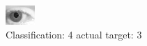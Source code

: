 \begin{figure}[h!]
\begin{center}
\includegraphics[width=0.60\columnwidth]{figures/ID191_class_4_target_3.png}
\end{center}
\caption{ Classification: 4 actual target: 3}
\label{fig:ID191_class_4_target_3}
\end{figure}
